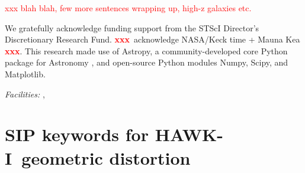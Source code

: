 \documentclass[preprint2]{aastex6}
\newcommand\xxx{{\textcolor{red}{\bf xxx}}}
\newcommand\XXX[1]{{\textcolor{red}{xxx #1}}}
\gdef\HAWKI{\mbox{HAWK-I}}
\begin{document}
\XXX{blah blah, few more sentences wrapping up, high-z galaxies etc.}



% 





%
%
\vspace{-0.3cm} %
\acknowledgements

\noindent We gratefully acknowledge funding support from the STScI Director's Discretionary Research Fund.  \xxx\ acknowledge NASA/Keck time + Mauna Kea \xxx. This research made use of Astropy, a community-developed core Python package for Astronomy \citep{astropy}, and open-source Python modules Numpy, Scipy, and Matplotlib. 


{\it Facilities:} ,  %


%


\appendix

\section{SIP keywords for \HAWKI\ geometric distortion}
\end{document}

